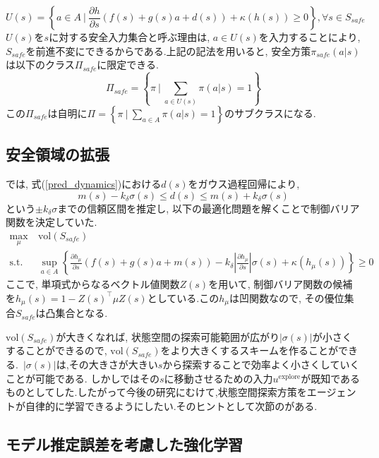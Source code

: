 \documentclass{jsarticle}
\newcommand{\pdif}[2]{\frac{\partial#1}{\partial#2}}
\begin{document}
\begin{equation}
	U(s)=\left\{a\in A~|~\pdif{h}{s}(f(s)+g(s)a+d(s))+\kappa(h(s))\geq 0\right\}, \forall s\in S_{safe}
\end{equation}
$U(s)$を$s$に対する安全入力集合と呼ぶ理由は, $a\in U(s)$を入力することにより, $S_{safe}$を前進不変にできるからである.上記の記法を用いると, 安全方策$\pi_{safe}(a|s)$は以下のクラス$\Pi_{safe}$に限定できる.
\begin{equation}
	\Pi_{safe} = \left\{\pi~|~\sum_{a\in U(s)}\pi(a|s)=1\right\}
\end{equation}
この$\Pi_{safe}$は自明に$\Pi=\left\{\pi~|~\sum_{a\in A}\pi(a|s)=1\right\}$のサブクラスになる.


\subsection{安全領域の拡張}
\cite{quad}では, 式(\ref{pred_dynamics})における$d(s)$をガウス過程回帰により,
\begin{equation}
	m(s)-k_{\delta}\sigma(s)\leq d(s) \leq m(s)+k_{\delta}\sigma(s)
\end{equation}
という$\pm k_{\delta}\sigma$までの信頼区間を推定し, 以下の最適化問題を解くことで制御バリア関数を決定していた.
\begin{align}
	\max_{\mu} &~\textrm{vol}(S_{safe}) \nonumber \\ 
	\textrm{s.t.} &~ \sup_{a\in A}\left\{\pdif{h_{\mu}}{s}(f(s)+g(s)a+m(s))-k_{\delta}\left|\pdif{h_{\mu}}{s}\right|\sigma(s)+\kappa(h_{\mu}(s))\right\}\geq 0 \nonumber
\end{align}
ここで, 単項式からなるベクトル値関数$Z(s)$を用いて, 制御バリア関数の候補を$h_{\mu}(s) = 1 - Z(s)^{\top}\mu Z(s)$としている.この$h_{\mu}$は凹関数なので, その優位集合$S_{safe}$は凸集合となる.\par
$\textrm{vol}(S_{safe})$が大きくなれば, 状態空間の探索可能範囲が広がり$|\sigma(s)|$が小さくすることができるので, $\textrm{vol}(S_{safe})$をより大きくするスキームを作ることができる\cite{quad}.~$|\sigma(s)|$は,その大きさが大きい$s$から探索することで効率よく小さくしていくことが可能である. しかし\cite{quad}ではその$s$に移動させるための入力$u^{\textrm{explore}}$が既知であるものとしてした.したがって今後の研究にむけて,状態空間探索方策をエージェントが自律的に学習できるようにしたい.そのヒントとして次節の\cite{MOPO}がある.

\subsection{モデル推定誤差を考慮した強化学習}
\end{document}

